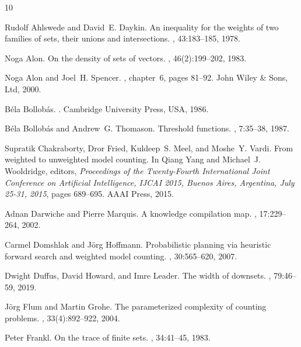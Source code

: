 \documentclass[11pt,a4paper]{article}
\theoremstyle{definition}
\begin{document}
%
%
\begin{thebibliography}{10}

Rudolf Ahlswede and David~E. Daykin.
\newblock An inequality for the weights of two families of sets, their unions
  and intersections.
, 43:183--185, 1978.

Noga Alon.
\newblock On the density of sets of vectors.
, 46(2):199--202, 1983.

Noga Alon and Joel~H. Spencer.
, chapter~6, pages 81--92.
\newblock John Wiley \& Sons, Ltd, 2000.

B\'{e}la Bollob\'{a}s.
.
\newblock Cambridge University Press, USA, 1986.

B{\'e}la Bollob{\'a}s and Andrew~G. Thomason.
\newblock Threshold functions.
, 7:35--38, 1987.

Supratik Chakraborty, Dror Fried, Kuldeep~S. Meel, and Moshe~Y. Vardi.
\newblock From weighted to unweighted model counting.
\newblock In Qiang Yang and Michael~J. Wooldridge, editors, {\em Proceedings of
  the Twenty-Fourth International Joint Conference on Artificial Intelligence,
  {IJCAI} 2015, Buenos Aires, Argentina, July 25-31, 2015}, pages 689--695.
  {AAAI} Press, 2015.

Adnan Darwiche and Pierre Marquis.
\newblock A knowledge compilation map.
, 17:229--264, 2002.

Carmel Domshlak and J{\"{o}}rg Hoffmann.
\newblock Probabilistic planning via heuristic forward search and weighted
  model counting.
, 30:565--620, 2007.

Dwight Duffus, David Howard, and Imre Leader.
\newblock The width of downsets.
, 79:46--59, 2019.

J{\"{o}}rg Flum and Martin Grohe.
\newblock The parameterized complexity of counting problems.
, 33(4):892--922, 2004.

Peter Frankl.
\newblock On the trace of finite sets.
, 34:41--45, 1983.


\end{thebibliography}
\end{document}
